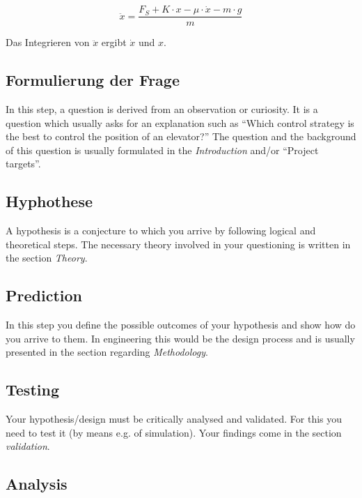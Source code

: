 	\begin{equation}
		\ddot{x} = \frac{F_{S} + K \cdot x - \mu \cdot \dot{x} - m \cdot g}{m}
		\label{eq:DifferenzengleichungAufgeloest}
	\end{equation}

	Das Integrieren von $\ddot{x}$ ergibt $\dot{x}$ und $x$.
	
	
	\subsection{Formulierung der Frage}
	
	In this step, a question is derived from an observation or curiosity. It is a question which usually asks for an explanation such as ``Which control strategy is the best to control the position of an elevator?'' The question and the background of this question is usually formulated in the \emph{Introduction} and/or ``Project targets''.
	
	\subsection{Hyphothese}
	
	A hypothesis is a conjecture to which you arrive by following logical and theoretical steps. The necessary theory involved in your questioning is written in the section \emph{Theory}.
	
	\subsection{Prediction}
	
	In this step you define the possible outcomes of your hypothesis and show how do you arrive to them. In engineering this would be the design process and is usually presented in the section regarding \emph{Methodology}.
	
	\subsection{Testing}
	
	Your hypothesis/design must be critically analysed and validated. For this you need to test it (by means e.g. of simulation). Your findings come in the section \emph{validation}.
	
	\subsection{Analysis}
	
